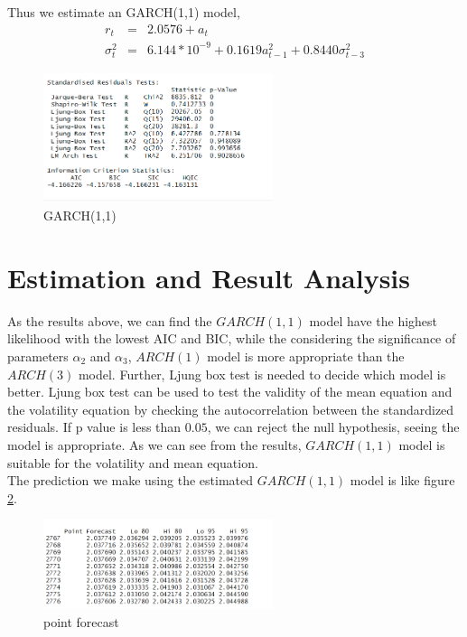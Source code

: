 \documentclass[12pt, a4paper, titlepage]{article}
\begin{document}
Thus we estimate an GARCH(1,1) model,
\begin{eqnarray*}
r_t &=& 2.0576 + a_t\\
\sigma_t^2 &=& 6.144*10^{-9} + 0.1619 a_{t-1}^2 + 0.8440 \sigma_{t-3}^2
\end{eqnarray*}
\begin{figure}[h!]
\begin{center}
\caption{GARCH(1,1)}\label{GARCH(1,1)}
\includegraphics[width=0.6\textwidth]{garch11a.png} 
\end{center}
\end{figure}

\section{Estimation and Result Analysis}
As the results above, we can find the $GARCH(1,1)$ model have the highest likelihood with the lowest AIC and BIC, while the considering the significance of parameters $\alpha_2$ and $\alpha_3$, $ARCH(1)$ model is more appropriate than the $ARCH(3)$ model. Further, Ljung box test is needed to decide which model is better. Ljung box test can be used to test the validity of the mean equation and the volatility equation by checking the autocorrelation between the standardized residuals. If p value is less than $0.05$, we can reject the null hypothesis, seeing the model is appropriate. As we can see from the results, $GARCH(1,1)$ model is suitable for the volatility and mean equation.\\

The prediction we make using the estimated $GARCH(1,1)$ model is like figure \ref{pre}.
\begin{figure}[h!]
\begin{center}
\caption{point forecast}\label{pre}
\includegraphics[width=0.6\textwidth]{pre.png}
\end{center}
\end{figure}
\end{document}
